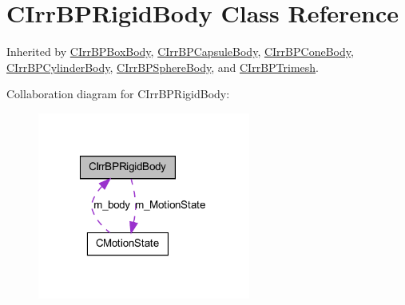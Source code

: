 \hypertarget{class_c_irr_b_p_rigid_body}{
\section{CIrrBPRigidBody Class Reference}
\label{class_c_irr_b_p_rigid_body}
}


Inherited by \hyperlink{class_c_irr_b_p_box_body}{CIrrBPBoxBody}, \hyperlink{class_c_irr_b_p_capsule_body}{CIrrBPCapsuleBody}, \hyperlink{class_c_irr_b_p_cone_body}{CIrrBPConeBody}, \hyperlink{class_c_irr_b_p_cylinder_body}{CIrrBPCylinderBody}, \hyperlink{class_c_irr_b_p_sphere_body}{CIrrBPSphereBody}, and \hyperlink{class_c_irr_b_p_trimesh}{CIrrBPTrimesh}.



Collaboration diagram for CIrrBPRigidBody:\nopagebreak
\begin{figure}[H]
\begin{center}
\leavevmode
\includegraphics[width=198pt]{class_c_irr_b_p_rigid_body__coll__graph}
\end{center}
\end{figure}
